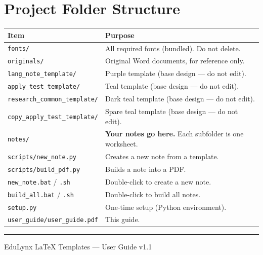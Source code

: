 \documentclass[a4paper,11pt]{article}
\begin{document}
\section{Project Folder Structure}

\renewcommand{\arraystretch}{1.3}
\begin{center}
\begin{tabularx}{\textwidth}{l X}
\toprule
\textbf{Item} & \textbf{Purpose} \\
\midrule
\texttt{fonts/} & All required fonts (bundled). Do not delete. \\
\texttt{originals/} & Original Word documents, for reference only. \\
\texttt{lang\_note\_template/} & Purple template (base design --- do not edit). \\
\texttt{apply\_test\_template/} & Teal template (base design --- do not edit). \\
\texttt{research\_common\_template/} & Dark teal template (base design --- do not edit). \\
\texttt{copy\_apply\_test\_template/} & Spare teal template (base design --- do not edit). \\
\texttt{notes/} & \textbf{Your notes go here.} Each subfolder is one worksheet. \\
\texttt{scripts/new\_note.py} & Creates a new note from a template. \\
\texttt{scripts/build\_pdf.py} & Builds a note into a PDF. \\
\texttt{new\_note.bat} / \texttt{.sh} & Double-click to create a new note. \\
\texttt{build\_all.bat} / \texttt{.sh} & Double-click to build all notes. \\
\texttt{setup.py} & One-time setup (Python environment). \\
\texttt{user\_guide/user\_guide.pdf} & This guide. \\
\bottomrule
\end{tabularx}
\end{center}

\vfill

\begin{center}
\rule{0.5\textwidth}{0.5pt}

\vspace{6pt}
{\small\color{gray} EduLynx LaTeX Templates --- User Guide v1.1}
\end{center}
\end{document}
